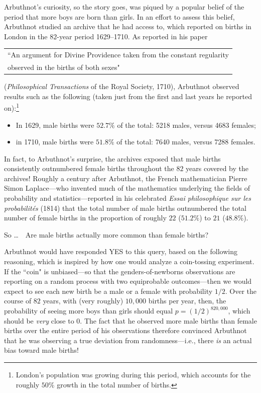 Arbuthnot's curiosity, so the story goes, was piqued by a popular belief of the period that more boys are born than girls.  In an effort to assess this belief, Arbuthnot studied an archive that he had access to, which reported on births in London in the $82$-year period 1629--1710.  As reported in his paper

\begin{tabular}{l}
``An argument for Divine Providence taken from the constant regularity \\
\hspace*{.05in}observed in the births of both sexes"
\end{tabular}

\noindent
({\it Philosophical Transactions} of the Royal Society, 1710), Arbuthnot observed results such as the following (taken just from the first and last years he reported on):\footnote{London's population was growing during this period, which accounts for the roughly $50\%$ growth in the total number of births.}
\begin{itemize}
\item
In 1629, male births were $52.7\%$ of the total: 5218 males, versus 4683 females;
\item
in 1710, male births were $51.8\%$ of the total: 7640 males, versus 7288 females.
\end{itemize}
In fact, to Arbuthnot's surprise, the archives exposed that male births consistently outnumbered female births throughout the $82$ years covered by the archives!  Roughly a century after Arbuthnot, the French mathematician Pierre Simon Laplace---who invented much of the mathematics underlying the fields of probability and statistics---reported in his celebrated {\it Essai philosophique sur les probabilit\'{e}s} (1814)
that the total number of male births outnumbered the total number of female births in the proportion of roughly $22$ ($51.2\%$) to $21$ ($48.8\%$).

\medskip

\noindent
So \ldots \ \ Are male births actually more common than female births?

\medskip

\noindent
Arbuthnot would have responded YES to this query, based on the following reasoning, which is inspired by how one would analyze a coin-tossing experiment.  If the ``coin" is unbiased---so that the genders-of-newborns observations are reporting on a random process with two equiprobable outcomes---then we would expect to see each new birth be a male or a female with probability $1/2$.  Over the course of $82$ years, with (very roughly) $10,000$ births per year, then, the probability of seeing more boys than girls should equal $p=(1/2)^{820,000}$, which should be {\em very} close to $0$.  The fact that he observed more male births than female births over the entire period of his observations therefore convinced Arbuthnot that he was observing a true deviation from randomness---i.e., there {\em is} an actual bias toward male births!

